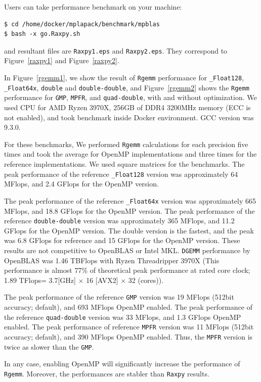\documentclass[12pt]{article}
\begin{document}
Users can take performance benchmark on your machine:
\begin{verbatim}
$ cd /home/docker/mplapack/benchmark/mpblas
$ bash -x go.Raxpy.sh
\end{verbatim}
and resultant files are {\tt Raxpy1.eps}  and {\tt Raxpy2.eps}. They correspond to Figure~\ref{raxpy1} and Figure~\ref{raxpy2}. 

In Figure~\ref{rgemm1}, we show the result of {\tt Rgemm} performance for {\tt \_Float128}, {\tt \_Float64x}, {\tt double} and  {\tt double-double}, and Figure~\ref{rgemm2} shows the {\tt Rgemm} performance for {\tt GMP}, {\tt MPFR}, and {\tt quad-double}, with and without optimization. We used CPU for AMD Ryzen 3970X, 256GB of DDR4 3200MHz memory (ECC is not enabled), and took benchmark inside Docker environment. GCC version was 9.3.0.

For these benchmarks, We performed {\tt Rgemm} calculations for each precision five times and took the average for OpenMP implementations and three times for the reference implementations. We used square matrices for the benchmarks.
The peak performance of the reference {\tt \_Float128} version was approximately 64 MFlops, and 2.4 GFlops for the OpenMP version. 

The peak performance of the reference {\tt \_Float64x} version
was approximately 665 MFlops, and 18.8 GFlops for the OpenMP version. The peak performance of the reference {\tt double-double} version was approximately 365 MFlops, and 11.2 GFlops for the OpenMP version. 
The double version is the fastest, and the peak was 6.8 GFlops for reference and 15 GFlops for the OpenMP version. These results are not competitive to OpenBLAS or Intel MKL. {\tt DGEMM} performance by OpenBLAS was 1.46 TBFlops with Ryzen Threadripper 3970X (This performance is almost 77\% of theoretical peak performance at rated core clock; 1.89 TFlops= 3.7[GHz] $\times$ 16 [AVX2] $\times$ 32 (cores)).

The peak performance of the reference {\tt GMP} version was 19 MFlops (512bit accuracy; default), and 693 MFlops OpenMP enabled.
The peak performance of the reference {\tt quad-double} version was 33 MFlops, and 1.3 GFlops OpenMP enabled.
The peak performance of reference {\tt MPFR} version was 11 MFlops (512bit accuracy; default), and 390 MFlops OpenMP enabled.
Thus, the {\tt MPFR} version is twice as slower than the {\tt GMP}.

In any case, enabling OpenMP will significantly increase the performance of {\tt Rgemm}. Moreover, the performances are stabler than {\tt Raxpy} results. 
\end{document}
